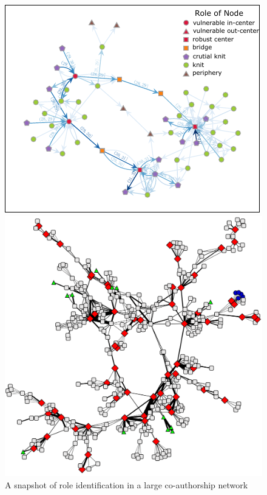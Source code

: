 \documentclass[a4paper,fleqn]{cas-sc}
\begin{document}
\begin{figure}
  \begin{minipage}[b]{0.55\textwidth}
     \centering
     \noindent\includegraphics[width=0.95\linewidth]{figs/notion_explanation.pdf}
     \caption{An illustration of role identification from the \newline case study of the dynamical bikesharing network in Nanjing.\newline Roles are interpreted with measurements concerning daily\newline operation. We will discuss it later in details}\label{fig:notion_explanation}
  \end{minipage}\hfill
  \begin{minipage}[b]{0.45\textwidth}
     \centering
     \noindent\includegraphics[width=0.95\linewidth]{figs/co_author_role.png}
     \caption{A snapshot of role identification in a \newline large co-authorship network\citep{henderson2011s}}\label{fig:coauthorrole}
  \end{minipage}
\end{figure}
\end{document}
